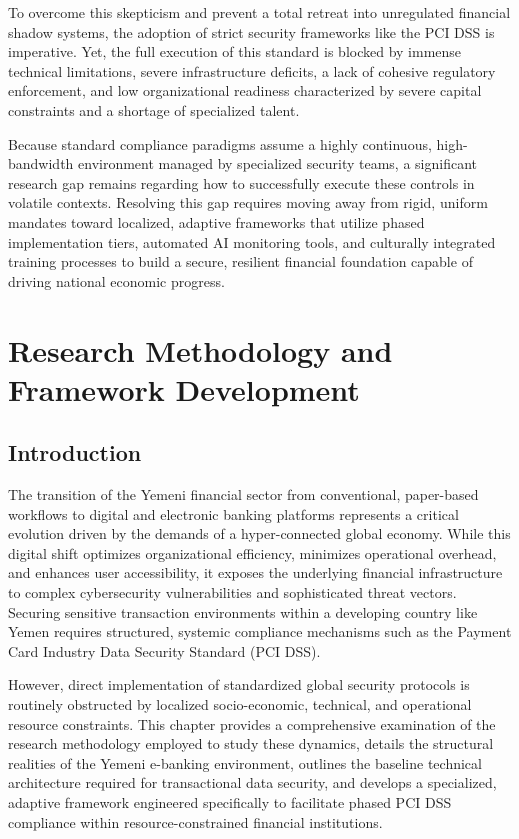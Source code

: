 \documentclass[12pt,a4paper,oneside]{report}
\begin{document}
	To overcome this skepticism and prevent a total retreat into unregulated financial shadow systems, the adoption of strict security frameworks like the PCI DSS is imperative. Yet, the full execution of this standard is blocked by immense technical limitations, severe infrastructure deficits, a lack of cohesive regulatory enforcement, and low organizational readiness characterized by severe capital constraints and a shortage of specialized talent. 
	
	Because standard compliance paradigms assume a highly continuous, high-bandwidth environment managed by specialized security teams, a significant research gap remains regarding how to successfully execute these controls in volatile contexts. Resolving this gap requires moving away from rigid, uniform mandates toward localized, adaptive frameworks that utilize phased implementation tiers, automated AI monitoring tools, and culturally integrated training processes to build a secure, resilient financial foundation capable of driving national economic progress.
	
	\chapter{Research Methodology and Framework Development}
	
	\section{Introduction}
	The transition of the Yemeni financial sector from conventional, paper-based workflows to digital and electronic banking platforms represents a critical evolution driven by the demands of a hyper-connected global economy. While this digital shift optimizes organizational efficiency, minimizes operational overhead, and enhances user accessibility, it exposes the underlying financial infrastructure to complex cybersecurity vulnerabilities and sophisticated threat vectors. Securing sensitive transaction environments within a developing country like Yemen requires structured, systemic compliance mechanisms such as the Payment Card Industry Data Security Standard (PCI DSS). 
	
	However, direct implementation of standardized global security protocols is routinely obstructed by localized socio-economic, technical, and operational resource constraints. This chapter provides a comprehensive examination of the research methodology employed to study these dynamics, details the structural realities of the Yemeni e-banking environment, outlines the baseline technical architecture required for transactional data security, and develops a specialized, adaptive framework engineered specifically to facilitate phased PCI DSS compliance within resource-constrained financial institutions.
	
\end{document}
